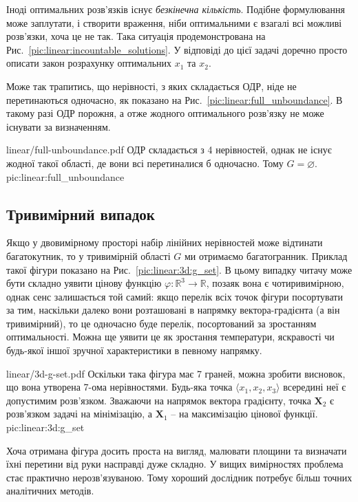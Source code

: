 \documentclass[\main/book.tex]{subfiles}
\begin{document}
Іноді оптимальних розв'язків існує \textit{безкінечна кількість}. Подібне формулювання може заплутати, і створити враження, ніби оптимальними є взагалі всі можливі розв'язки, хоча це не так. Така ситуація продемонстрована на Рис.~\ref{pic:linear:incountable_solutions}. У відповіді до цієї задачі доречно просто описати закон розрахунку оптимальних $x_1$ та $x_2$.

Може так трапитись, що нерівності, з яких складається ОДР, ніде не перетинаються одночасно, як показано на Рис.~\ref{pic:linear:full_unboundance}. В такому разі ОДР порожня, а отже жодного оптимального розв'язку не може існувати за визначенням.

\illustration
 {linear/full-unboundance.pdf}
 {ОДР складається з 4 нерівностей, однак не існує жодної такої області, де вони всі перетиналися б одночасно. Тому $G = \varnothing$.}
 {pic:linear:full_unboundance}

\subsection{Тривимірний випадок}

Якщо у двовимірному просторі набір лінійних нерівностей може відтинати багатокутник, то у тривимірній області $G$ ми отримаємо багатогранник. Приклад такої фігури показано на Рис.~\ref{pic:linear:3d:g_set}. В цьому випадку читачу може бути складно уявити цінову функцію ${\varphi: \mathbb{R}^3 \rightarrow \mathbb{R}}$, позаяк вона є чотиривимірною, однак сенс залишається той самий: якщо перелік всіх точок фігури посортувати за тим, наскільки \flqq{}далеко\frqq{} вони розташовані в напрямку вектора-градієнта (а він тривимірний), то це одночасно буде перелік, посортований за зростанням оптимальності. Можна ще уявити це як зростання температури, яскравості чи будь-якої іншої зручної характеристики в певному напрямку.

\illustration
 {linear/3d-g-set.pdf}
 {Оскільки така фігура має 7 граней, можна зробити висновок, що вона утворена 7-ома нерівностями. Будь-яка точка $\langle x_1, x_2, x_3 \rangle$ всередині неї є допустимим розв'язком. Зважаючи на напрямок вектора градієнту, точка $\mathbf{X}_2$ є розв'язком задачі на мінімізацію, а $\mathbf{X}_1$ -- на максимізацію цінової функції.}
 {pic:linear:3d:g_set}
 
\begin{note}
 Хоча отримана фігура досить проста на вигляд, малювати площини та визначати їхні перетини від руки насправді дуже складно. У вищих вимірностях проблема стає практично нерозв'язуваною. Тому хороший дослідник потребує більш точних аналітичних методів.
\end{note}
\end{document}
